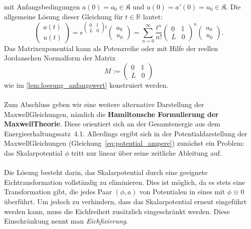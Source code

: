 \documentclass[11pt,a4paper,leqno]{report}
\numberwithin{equation}{chapter}
\begin{document}
mit Anfangsbedingungen \( a(0) = a_0 \in \mathfrak{K} \) und \( u(0) = a'(0) = u_0 \in \mathfrak{K} \). Die allgemeine Lösung dieser Gleichung für \( t \in \mathbb{R} \) lautet:
\begin{equation}
	\begin{pmatrix}
		a(t) \\
		u(t)
	\end{pmatrix}
	=
	e^{ 
		\begin{pmatrix}
			0 & \mathbb{I} \\
			L & 0
		\end{pmatrix} t 
	}
	\begin{pmatrix}
		a_0 \\
		u_0
	\end{pmatrix}
	= \sum_{n=0}^\infty \frac{t^n}{n!}
	\begin{pmatrix}
		0 & \mathbb{I} \\
		L & 0
	\end{pmatrix}^n
	\begin{pmatrix}
		a_0 \\
		u_0
	\end{pmatrix}.
\end{equation}
Das Matrixexponential kann als Potenzreihe oder mit Hilfe der reellen Jordanschen Normalform der Matrix 
\[
M := \begin{pmatrix}
	0 & \mathbb{I} \\
	L & 0
\end{pmatrix}
\] 
wie im \eqref{lem:loesung_anfangswert} konstruiert werden.
\\
\\
Zum Abschluss geben wir eine weitere alternative Darstellung der Maxwell\-Gleichungen, 
nämlich die \textbf{Hamiltonsche Formulierung der Maxwell\-Theorie}. 
Diese orientiert sich an der Gesamtenergie aus dem Energieerhaltungssatz~4.1. 
Allerdings ergibt sich in der Potentialdarstellung der Maxwell\-Gleichungen 
(Gleichung~\eqref{eq:potential_ampere}) zunächst ein Problem: 
das Skalarpotential \(\phi\) tritt nur linear über seine zeitliche Ableitung auf. \\
\\
Die Lösung besteht darin, das Skalarpotential durch eine geeignete Eichtransformation 
vollständig zu eliminieren. Dies ist möglich, da es stets eine Transformation gibt, 
die jedes Paar \((\phi, a)\) von Potentialen in eines mit \(\phi \equiv 0\) überführt. 
Um jedoch zu verhindern, dass das Skalarpotential erneut eingeführt werden kann, 
muss die Eichfreiheit zusätzlich eingeschränkt werden.  
Diese Einschränkung nennt man \emph{Eichfixierung}. 
\end{document}
